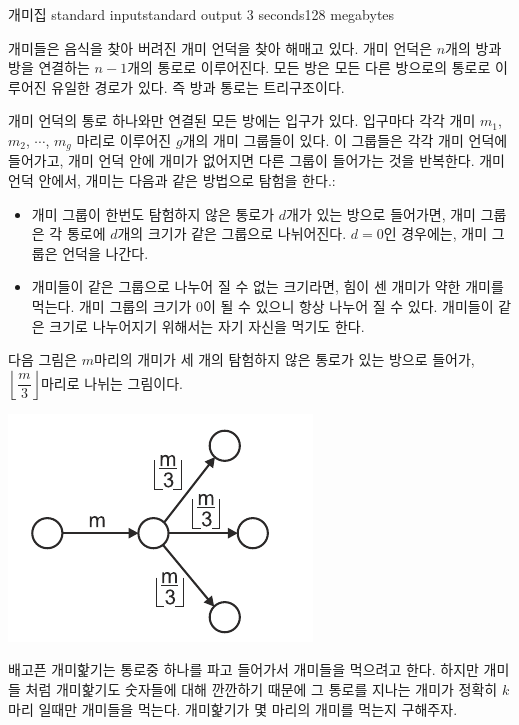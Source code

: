 \begin{problem}{개미집}
	{standard input}{standard output}
	{3 seconds}{128 megabytes}{}
	
	개미들은 음식을 찾아 버려진 개미 언덕을 찾아 해매고 있다. 개미 언덕은 $n$개의 방과 방을 연결하는 $n-1$개의 통로로 이루어진다. 모든 방은 모든 다른 방으로의 통로로 이루어진 유일한 경로가 있다. 즉 방과 통로는 트리구조이다.
	
	개미 언덕의 통로 하나와만 연결된 모든 방에는 입구가 있다. 입구마다 각각 개미 $m_1$, $m_2$, $\cdots$, $m_g$ 마리로 이루어진 $g$개의 개미 그룹들이 있다. 이 그룹들은 각각 개미 언덕에 들어가고, 개미 언덕 안에 개미가 없어지면 다른 그룹이 들어가는 것을 반복한다. 개미 언덕 안에서, 개미는 다음과 같은 방법으로 탐험을 한다.:
	
	\begin{itemize}
		\item 개미 그룹이 한번도 탐험하지 않은 통로가 $d$개가 있는 방으로 들어가면, 개미 그룹은 각 통로에 $d$개의 크기가 같은 그룹으로 나뉘어진다. $d = 0$인 경우에는, 개미 그룹은 언덕을 나간다.
		\item 개미들이 같은 그룹으로 나누어 질 수 없는 크기라면, 힘이 센 개미가 약한 개미를 먹는다. 개미 그룹의 크기가 0이 될 수 있으니 항상 나누어 질 수 있다. 개미들이 같은 크기로 나누어지기 위해서는 자기 자신을 먹기도 한다.
	\end{itemize}
	
	다음 그림은 $m$마리의 개미가 세 개의 탐험하지 않은 통로가 있는 방으로 들어가, $\left\lfloor \dfrac{m}{3} \right\rfloor$마리로 나뉘는 그림이다. 
	 
	\begin{center}
		\includegraphics[]{mro1.png}
	\end{center}
	 
	
	배고픈 개미핥기는 통로중 하나를 파고 들어가서 개미들을 먹으려고 한다. 하지만 개미들 처럼 개미핥기도 숫자들에 대해 깐깐하기 때문에 그 통로를 지나는 개미가 정확히 $k$마리 일때만 개미들을 먹는다. 개미핥기가 몇 마리의 개미를 먹는지 구해주자. 
	

\end{problem}
